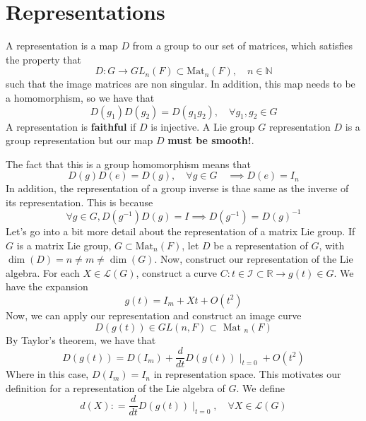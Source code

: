 \section{Representations}

A representation is a map $ D $ from a group 
to our set of matrices, which satisfies the property that 
\[
	D : G \to  GL_ n ( F ) \subset \text{Mat}_n (  F), \quad n \in \mathbb{ N }
\] such that the image matrices 
are non singular. In addition, this map 
needs to be a homomorphism, so we have that 
\[
	D( g_1 )  D( g_2) = D ( g_1 g_2 ) , \quad \forall g_1, g_2 \in G 
\] A representation is \textbf{faithful} if $ D $ is injective. 
A Lie group $G$ representation $ D $ is a group representation 
but our map $ D $ \textbf{must be smooth!}.

The fact that this is a 
group homomorphism means that 
\[
	D ( g ) D ( e) =  D( g), \quad \forall g \in G  \quad \implies D ( e ) = I_ n 
\] In addition, 
the representation of a group inverse is thae 
same as the inverse of its representation. This is because 
\[
	\forall g \in G, D ( g ^{ -1  } ) D ( g) = I \implies D ( g ^{ -1  } )  = D ( g) ^{ -1 }
\]  
Let's go into a bit more detail about the representation
of a matrix Lie group. If $ G $ is a matrix Lie group, 
$ G \subset \text{Mat} _n ( F )  $, let $ D $ 
be a representation of $ G$, with  $ \dim ( D ) = n \neq m \neq \dim ( G ) $. 
Now, construct our representation of 
the Lie algebra. 
For each  $ X \in \mathcal{ L } ( G ) $, 
construct a curve $ C : t \in \mathcal{ I } \subset \mathbb{ R} \to g ( t) \in G $. 
We have the expansion 
\[
 g ( t) = I_m + Xt + O ( t ^ 2 ) 
\] Now, we can apply our
representation and construct an image curve
\[
	D ( g ( t ) ) \in GL( n, F ) \subset \text{ Mat }_n ( F) 
\] By Taylor's theorem, 
we have that 
\[
	D ( g ( t ) ) = D ( I _ m ) + \frac{d }{ dt } D ( g ( t) ) \mid_{ t = 0 } + O ( t^ 2 ) 
\] Where in this case, $ D ( I _ m )  = I _ n $ in
representation space. This motivates our definition 
for a representation of the Lie algebra of  $ G $.
We define 
\[
	d ( X) : = \frac{d }{ dt  }  D( g ( t ) ) \mid_{ t =0 }, \quad \forall X \in \mathcal{ L } ( G ) 
\] 

